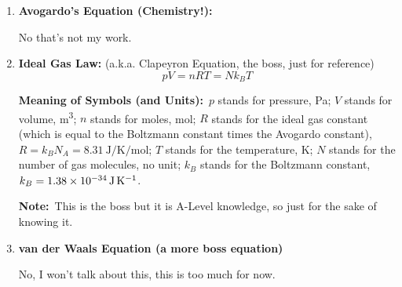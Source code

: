 \documentclass[8pt]{article}
\newcommand{\MeanSymb}{\textbf{Meaning of Symbols (and Units):}\ }
\newcommand{\Note}{\textbf{Note:}\ }
\begin{document}
\begin{enumerate}
                \Note This only remains true if the volume is a constant.

                \item \textbf{Avogardo's Equation (Chemistry!):}
                
                No that's not my work.

                \item \textbf{Ideal Gas Law:} (a.k.a. Clapeyron Equation, the boss, just for reference)
                \[
                    pV = nRT = Nk_{B}T
                \]

                \MeanSymb \(p\) stands for pressure, \unit{\pascal}; \(V\) stands for volume, \unit{\metre\cubed}; \(n\) stands for moles, \unit{\mole}; \(R\) stands for the ideal gas constant (which is equal to the Boltzmann constant times the Avogardo constant), \(R = k_B N_A = \qty{8.31}{\joule \per \kelvin \per \mole}\); \(T\) stands for the temperature, \unit{\kelvin}; \(N\) stands for the number of gas molecules, no unit; \(k_B\) stands for the Boltzmann constant, \(k_B = \qty{1.38 e -34}{\joule \per \kelvin}\).

                \Note This is the boss but it is A-Level knowledge, so just for the sake of knowing it.
                
                \item \textbf{van der Waals Equation (a more boss equation)}
                
                No, I won't talk about this, this is too much for now.
            \end{enumerate}
\end{document}
